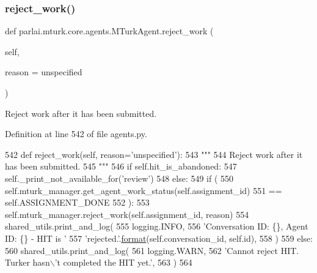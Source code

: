 \subsubsection{\texorpdfstring{reject\+\_\+work()}{reject\_work()}}
{\footnotesize\ttfamily def parlai.\+mturk.\+core.\+agents.\+M\+Turk\+Agent.\+reject\+\_\+work (\begin{DoxyParamCaption}\item[{}]{self,  }\item[{}]{reason = {\ttfamily \textquotesingle{}unspecified\textquotesingle{}} }\end{DoxyParamCaption})}

\begin{DoxyVerb}Reject work after it has been submitted.
\end{DoxyVerb}
 

Definition at line 542 of file agents.\+py.


\begin{DoxyCode}
542     \textcolor{keyword}{def }reject\_work(self, reason='unspecified'):
543         \textcolor{stringliteral}{"""}
544 \textcolor{stringliteral}{        Reject work after it has been submitted.}
545 \textcolor{stringliteral}{        """}
546         \textcolor{keywordflow}{if} self.hit\_is\_abandoned:
547             self.\_print\_not\_available\_for(\textcolor{stringliteral}{'review'})
548         \textcolor{keywordflow}{else}:
549             \textcolor{keywordflow}{if} (
550                 self.mturk\_manager.get\_agent\_work\_status(self.assignment\_id)
551                 == self.ASSIGNMENT\_DONE
552             ):
553                 self.mturk\_manager.reject\_work(self.assignment\_id, reason)
554                 shared\_utils.print\_and\_log(
555                     logging.INFO,
556                     \textcolor{stringliteral}{'Conversation ID: \{\}, Agent ID: \{\} - HIT is '}
557                     \textcolor{stringliteral}{'rejected.'}.\hyperlink{namespaceparlai_1_1chat__service_1_1services_1_1messenger_1_1shared__utils_a32e2e2022b824fbaf80c747160b52a76}{format}(self.conversation\_id, self.id),
558                 )
559             \textcolor{keywordflow}{else}:
560                 shared\_utils.print\_and\_log(
561                     logging.WARN,
562                     \textcolor{stringliteral}{'Cannot reject HIT. Turker hasn\(\backslash\)'t completed the HIT yet.'},
563                 )
564 
\end{DoxyCode}
\mbox{\label{classparlai_1_1mturk_1_1core_1_1agents_1_1MTurkAgent_ade43480595cc2f6be96b5eb690e3128d}} 
